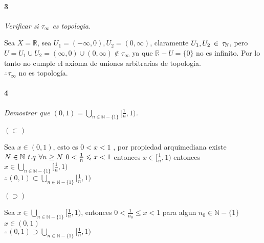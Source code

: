 \documentclass[12pt]{article}
\begin{document}
\paragraph{3}
\textit{Verificar si $\tau_{\infty}$ es topologia.} 

Sea $X=\mathbb{R}$, sea $U_1 = (-\infty,0),U_2 = (0,\infty)$, claramente $U_1,U_{2}\hspace{2px}\in\hspace{2px}\tau_{\mathbb{N}}$, pero $U=U_1\cup U_2 = (\infty,0)\cup(0,\infty)\notin \tau_{\infty}$
ya que $\mathbb{R}-U=\{0\}$ no es infinito. Por lo tanto no cumple el axioma de uniones arbitrarias de topología.\\ $\therefore\tau_{\infty}$ no es topología.\\

\paragraph{4}
\textit{Demostrar que $(0,1)=\bigcup\limits_{n\in\mathbb{N}-\{1\}}[\frac{1}{n},1)$.}

$(\subset)$

Sea $x\in(0,1)$, esto es $0<x<1$ , por propiedad arquimediana existe $ N \in\mathbb{N}\hspace{4px}t.q \hspace{4px} \forall n\geq N \hspace{4px} 0< \frac{1}{n} \leqslant  x<1$ entonces $x\in[\frac{1}{n},1)$
entonces $x\in\bigcup\limits_{n\in\mathbb{N}-\{1\}}[\frac{1}{n},1)$\\$\therefore(0,1)\subset\bigcup\limits_{n\in\mathbb{N}-\{1\}}[\frac{1}{n},1)$

$(\supset)$

Sea $x\in\bigcup\limits_{n\in\mathbb{N}-\{1\}}[\frac{1}{n},1)$, entonces $0<\frac{1}{n_0}\leq x<1$ para algun $n_0\in\mathbb{N}-\{1\}$\\$x\in(0,1)$\\$\therefore(0,1)\supset\bigcup\limits_{n\in\mathbb{N}-\{1\}}[\frac{1}{n},1)$
\end{document}
